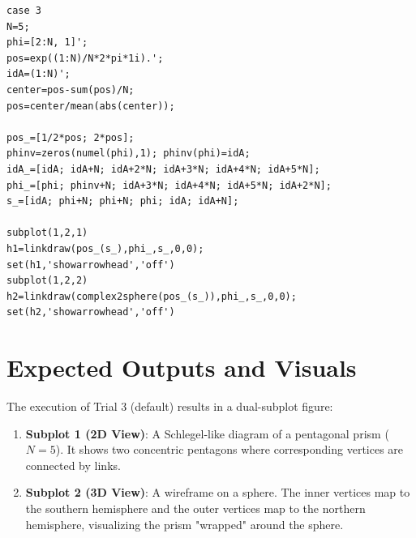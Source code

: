 \begin{lstlisting}
case 3 
N=5;
phi=[2:N, 1]';
pos=exp((1:N)/N*2*pi*1i).';
idA=(1:N)';
center=pos-sum(pos)/N;
pos=center/mean(abs(center));

pos_=[1/2*pos; 2*pos];
phinv=zeros(numel(phi),1); phinv(phi)=idA;
idA_=[idA; idA+N; idA+2*N; idA+3*N; idA+4*N; idA+5*N];
phi_=[phi; phinv+N; idA+3*N; idA+4*N; idA+5*N; idA+2*N];
s_=[idA; phi+N; phi+N; phi; idA; idA+N];

subplot(1,2,1)
h1=linkdraw(pos_(s_),phi_,s_,0,0);
set(h1,'showarrowhead','off')
subplot(1,2,2)
h2=linkdraw(complex2sphere(pos_(s_)),phi_,s_,0,0);
set(h2,'showarrowhead','off')
\end{lstlisting}

\section{Expected Outputs and Visuals}

The execution of Trial 3 (default) results in a dual-subplot figure:



\begin{enumerate}
    \item \textbf{Subplot 1 (2D View)}: A Schlegel-like diagram of a pentagonal prism ($N=5$). It shows two concentric pentagons where corresponding vertices are connected by links.
    \item \textbf{Subplot 2 (3D View)}: A wireframe on a sphere. The inner vertices map to the southern hemisphere and the outer vertices map to the northern hemisphere, visualizing the prism "wrapped" around the sphere.
\end{enumerate}
